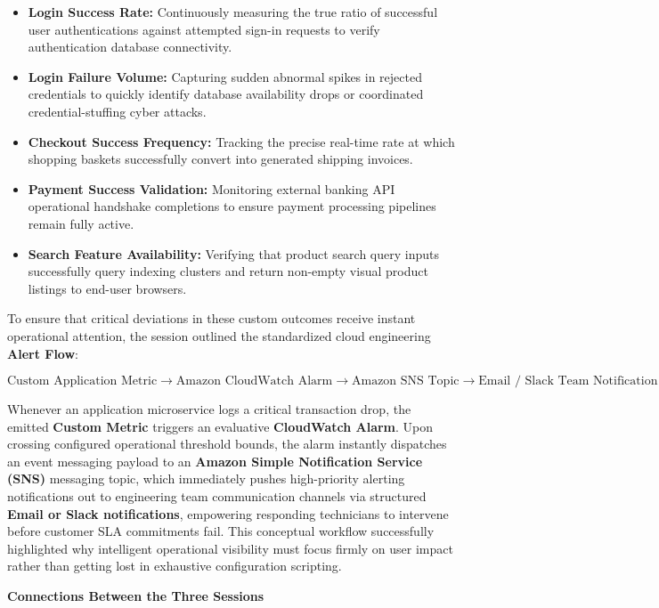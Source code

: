 \begin{itemize}
\tightlist
\item
  \textbf{Login Success Rate:} Continuously measuring the true ratio of
  successful user authentications against attempted sign-in requests to
  verify authentication database connectivity.
\item
  \textbf{Login Failure Volume:} Capturing sudden abnormal spikes in
  rejected credentials to quickly identify database availability drops
  or coordinated credential-stuffing cyber attacks.
\item
  \textbf{Checkout Success Frequency:} Tracking the precise real-time
  rate at which shopping baskets successfully convert into generated
  shipping invoices.
\item
  \textbf{Payment Success Validation:} Monitoring external banking API
  operational handshake completions to ensure payment processing
  pipelines remain fully active.
\item
  \textbf{Search Feature Availability:} Verifying that product search
  query inputs successfully query indexing clusters and return non-empty
  visual product listings to end-user browsers.
\end{itemize}

To ensure that critical deviations in these custom outcomes receive
instant operational attention, the session outlined the standardized
cloud engineering \textbf{Alert Flow}:

\[\text{Custom Application Metric} \longrightarrow \text{Amazon CloudWatch Alarm} \longrightarrow \text{Amazon SNS Topic} \longrightarrow \text{Email / Slack Team Notification}\]

Whenever an application microservice logs a critical transaction drop,
the emitted \textbf{Custom Metric} triggers an evaluative
\textbf{CloudWatch Alarm}. Upon crossing configured operational
threshold bounds, the alarm instantly dispatches an event messaging
payload to an \textbf{Amazon Simple Notification Service (SNS)}
messaging topic, which immediately pushes high-priority alerting
notifications out to engineering team communication channels via
structured \textbf{Email or Slack notifications}, empowering responding
technicians to intervene before customer SLA commitments fail. This
conceptual workflow successfully highlighted why intelligent operational
visibility must focus firmly on user impact rather than getting lost in
exhaustive configuration scripting.

\vspace{0.5em}\noindent\textbf{Connections Between the Three
Sessions}\par

